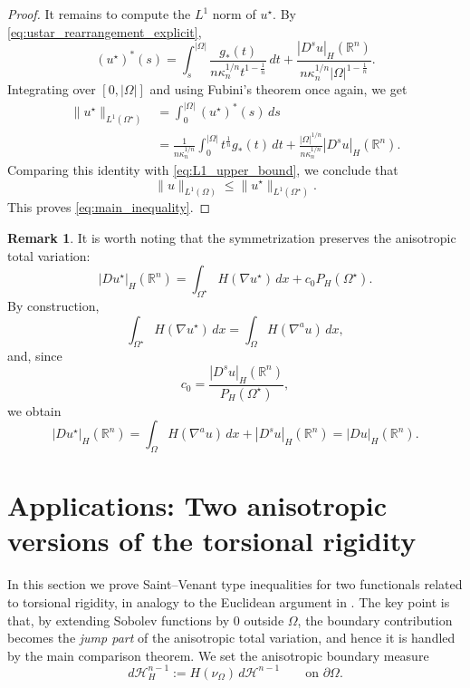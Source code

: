 \documentclass[oneside,a4paper,12pt,notitlepage]{article}
\theoremstyle{definition}
\newtheorem{remark}[theorem]{Remark}
\newcommand{\R}{\mathbb{R}}
\begin{document}
\begin{proof}
It remains to compute the $L^1$ norm of $u^\star$. By
\eqref{eq:ustar_rearrangement_explicit},
\[
(u^\star)^*(s)
=
\int_s^{|\Omega|}
\frac{g_*(t)}{n\kappa_n^{1/n}t^{1-\frac1n}}\,dt
+
\frac{|D^s u|_H(\mathbb{R}^n)}{n\kappa_n^{1/n}|\Omega|^{1-\frac1n}}.
\]
Integrating over $[0,|\Omega|]$ and using Fubini's theorem once again, we get
\begin{align*}
\|u^\star\|_{L^1(\Omega^\star)}
&=
\int_0^{|\Omega|}(u^\star)^*(s)\,ds \\
&=
\frac1{n\kappa_n^{1/n}}
\int_0^{|\Omega|} t^{\frac1n} g_*(t)\,dt
+
\frac{|\Omega|^{1/n}}{n\kappa_n^{1/n}}|D^s u|_H(\mathbb{R}^n).
\end{align*}
Comparing this identity with \eqref{eq:L1_upper_bound}, we conclude that
\[
\|u\|_{L^1(\Omega)}\le \|u^\star\|_{L^1(\Omega^\star)}.
\]
This proves \eqref{eq:main_inequality}.
\end{proof}



\begin{remark}
It is worth noting that the symmetrization preserves the anisotropic total variation:
\[
|Du^\star|_H(\mathbb R^n)
=
\int_{\Omega^\star} H(\nabla u^\star)\,dx
+
c_0 P_H(\Omega^\star).
\]
By construction,
\[
\int_{\Omega^\star} H(\nabla u^\star)\,dx
=
\int_\Omega H(\nabla^a u)\,dx,
\]
and, since
\[
c_0=\frac{|D^s u|_H(\mathbb R^n)}{P_H(\Omega^\star)},
\]
we obtain
\[
|Du^\star|_H(\mathbb R^n)
=
\int_\Omega H(\nabla^a u)\,dx
+
|D^s u|_H(\mathbb R^n)
=
|Du|_H(\mathbb R^n).
\]
\end{remark}




\section {Applications: Two anisotropic versions of the torsional rigidity}
\label{sec:torsion_aniso}


In this section we prove Saint--Venant type inequalities for two functionals related to torsional rigidity, in analogy to  the Euclidean argument in \cite{AGNT24}.
The key point is that, by extending Sobolev functions by $0$ outside $\Omega$, the boundary contribution becomes the \emph{jump part}
of the anisotropic total variation, and hence it is handled by the main comparison theorem.
We set the anisotropic boundary measure
\[
d\mathcal H^{n-1}_H := H(\nu_\Omega)\,d\mathcal H^{n-1}\qquad\text{on }\partial\Omega.
\]
\end{document}
